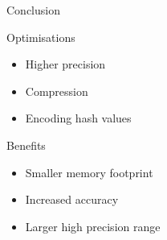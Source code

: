 \documentclass{beamer}
\begin{document}
\begin{frame}{Conclusion}

\begin{block}{Optimisations}
\begin{itemize}
\item Higher precision
\item Compression
\item Encoding hash values
\end{itemize}
\end{block}


\begin{block}{Benefits}
\begin{itemize}
\item Smaller memory footprint
\item Increased accuracy
\item Larger high precision range 
\end{itemize}
\end{block}

\end{frame}
\end{document}
